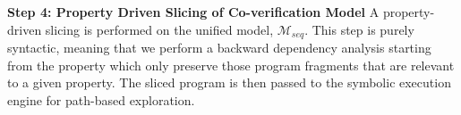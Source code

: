 \documentclass[sigconf]{acmart}
\newcommand{\tool}[1]{\textsc{#1}\xspace}
\newcommand{\verifox}{\tool{CoVeriIf}}
\begin{document}
\textbf{Step 4: Property Driven Slicing of Co-verification Model}
A property-driven slicing is performed on the unified model, $\mathcal{M}_{seq}$.  
This step is purely syntactic, meaning that we perform a backward dependency 
analysis starting from the property which only preserve those 
program fragments that are relevant to a given property. The sliced program 
is then passed to the symbolic execution engine for path-based exploration. \\
%

%
\end{document}
